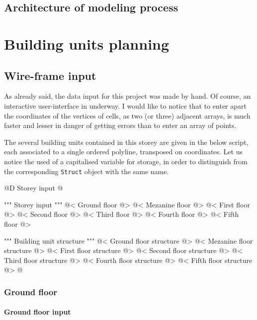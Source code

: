 \documentclass[11pt,oneside]{article}    %
\begin{document}
\subsection{Architecture of modeling process}



\section{Building units planning}

\subsection{Wire-frame input}

As already said, the data input for this project was made by hand. Of course, an
interactive user-interface in underway. I would like to notice that to enter apart the 
coordinates of the vertices of cells, as two (or three) adjacent arrays, is much 
faster and lesser in danger of getting errors than to enter an array of points.

The several building units contained in this storey are given in the below script,
each associated to a single ordered polyline, transposed on coordinates. Let us notice the used of 
a capitalised variable for storage, in order to distinguish from the corresponding \texttt{Struct}
object with the same name.

@D Storey input
@{""" Storey input """
@< Ground floor @>
@< Mezanine floor @>
@< First floor @>
@< Second floor @>
@< Third floor @>
@< Fourth floor @>
@< Fifth floor @>

""" Building unit structure """
@< Ground floor structure @>
@< Mezanine floor structure @>
@< First floor structure @>
@< Second floor structure @>
@< Third floor structure @>
@< Fourth floor structure @>
@< Fifth floor structure @>
@}


\subsubsection{Ground floor}
\paragraph{Ground floor input}
\end{document}
